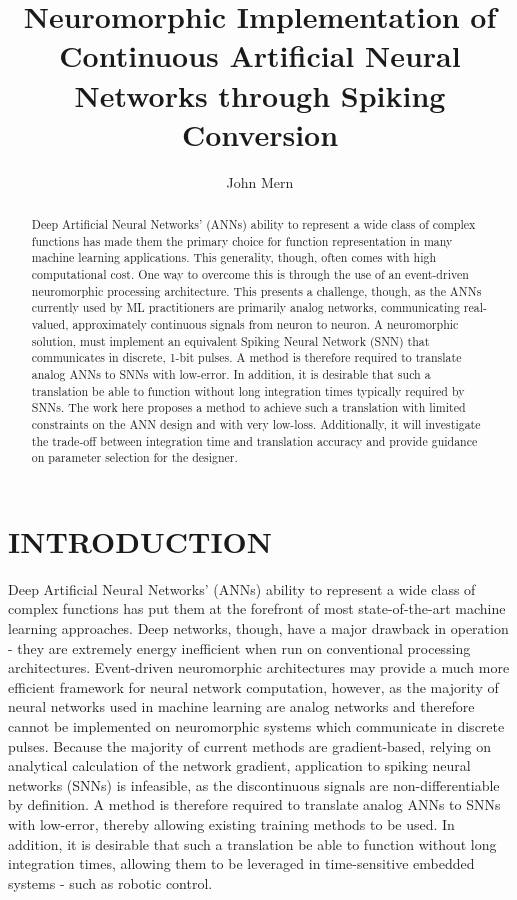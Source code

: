 \documentclass[letterpaper, 10 pt, conference]{ieeeconf}  %
\title{\LARGE \bf
Neuromorphic Implementation of Continuous Artificial Neural Networks through Spiking Conversion  
}
\author{John Mern%
}
\begin{document}
\maketitle
\thispagestyle{empty}
\pagestyle{empty}


\begin{abstract}

Deep Artificial Neural Networks' (ANNs) ability to represent a wide class of complex functions has made them the primary choice for function representation in many machine learning applications. This generality, though, often comes with high computational cost. One way to overcome this is through the use of an event-driven neuromorphic processing architecture. This presents a challenge, though, as the ANNs currently used by ML practitioners are primarily analog networks, communicating real-valued, approximately continuous signals from neuron to neuron. A neuromorphic solution, must implement an equivalent Spiking Neural Network (SNN) that communicates in discrete, 1-bit pulses. A method is therefore required to translate analog ANNs to SNNs with low-error. In addition, it is desirable that such a translation be able to function without long integration times typically required by SNNs. The work here proposes a method to achieve such a translation with limited constraints on the ANN design and with very low-loss. Additionally, it will investigate the trade-off between integration time and translation accuracy and provide guidance on parameter selection for the designer.  
\end{abstract}

\section{INTRODUCTION}

Deep Artificial Neural Networks' (ANNs) ability to represent a wide class of complex functions has put them at the forefront of most state-of-the-art machine learning approaches. Deep networks, though, have a major drawback in operation - they are extremely energy inefficient when run on conventional processing architectures. Event-driven neuromorphic architectures may provide a much more efficient framework for neural network computation, however, as the majority of neural networks used in machine learning are analog networks and therefore cannot be implemented on neuromorphic systems which communicate in discrete pulses. Because the majority of current methods are gradient-based, relying on analytical calculation of the network gradient, application to spiking neural networks (SNNs) is infeasible, as the discontinuous signals are non-differentiable by definition. A method is therefore required to translate analog ANNs to SNNs with low-error, thereby allowing existing training methods to be used. In addition, it is desirable that such a translation be able to function without long integration times, allowing them to be leveraged in time-sensitive embedded systems - such as robotic control. 
\end{document}
